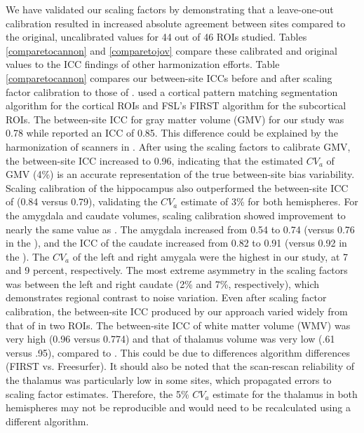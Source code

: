 We have validated our scaling factors by demonstrating that a leave-one-out calibration resulted in increased absolute agreement between sites compared to the original, uncalibrated values for 44 out of 46 ROIs studied. Tables \ref{comparetocannon} and \ref{comparetojov} compare these calibrated and original values to the ICC findings of other harmonization efforts. Table \ref{comparetocannon} compares our between-site ICCs before and after scaling factor calibration to those of \cite{cannon2014}. \cite{cannon2014} used a cortical pattern matching segmentation algorithm \cite{thompson2001detecting} for the cortical ROIs and FSL's FIRST algorithm for the subcortical ROIs. The between-site ICC for gray matter volume (GMV) for our study was 0.78 while \cite{cannon2014} reported an ICC of 0.85. This difference could be explained by the harmonization of scanners in \cite{cannon2014}. After using the scaling factors to calibrate GMV, the between-site ICC increased to 0.96, indicating that the estimated $CV_a$ of GMV (4\%) is an accurate representation of the true between-site bias variability. Scaling calibration of the hippocampus also outperformed the between-site ICC of \cite{cannon2014} (0.84 versus 0.79), validating the $CV_a$ estimate of 3\% for both hemispheres. For the amygdala and caudate volumes, scaling calibration showed improvement to nearly the same value as \cite{cannon2014}. The amygdala increased from 0.54 to 0.74 (versus 0.76 in the \cite{cannon2014}), and the ICC of the caudate increased from 0.82 to 0.91 (versus 0.92 in the \cite{cannon2014}). The $CV_a$ of the left and right amygala were the highest in our study, at 7 and 9 percent, respectively. The most extreme asymmetry in the scaling factors was between the left and right caudate (2\% and 7\%, respectively), which demonstrates regional contrast to noise variation. Even after scaling factor calibration, the between-site ICC produced by our approach varied widely from that of \cite{cannon2014} in two ROIs. The between-site ICC of white matter volume (WMV) was very high (0.96 versus 0.774) and that of thalamus volume was very low (.61 versus .95), compared to \cite{cannon2014}. This could be due to differences algorithm differences (FIRST vs. Freesurfer). It should also be noted that the scan-rescan reliability of the thalamus was particularly low in some sites, which propagated errors to scaling factor estimates. Therefore, the 5\% $CV_a$ estimate for the thalamus in both hemispheres may not be reproducible and would need to be recalculated using a different algorithm. 

